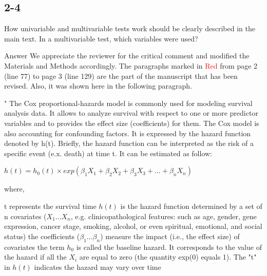 \documentclass[preprint,12pt]{elsarticle}
\newenvironment{MyColorPar}[1]{%
    \leavevmode\color{#1}\ignorespaces%
}{%
}%
\begin{document}
\subsection*{2-4} %
How univariable and multivariable tests work should be clearly described in the main text. In a multivariable test, which variables were used?




%
\begin{MyColorPar}{blue}
Answer
We appreciate the reviewer for the critical comment and modified the Materials and Methods accordingly.
The paragraphs marked in \textcolor{red}{Red} from page 2 (line 77) to page 3 (line 129) are the part of the manuscript that has been revised. Also, it was shown here in the following paragraph.
\\[0.3cm]

\begin{MyColorPar}{red}
"
The Cox proportional-hazards model\cite{Cox1972}\cite{Andersen1982} is commonly used for modeling survival analysis data. It allows to analyze survival with respect to one or more predictor variables and to provides the effect size (coefficients) for them\cite{Bradburn2003b}. %
The Cox model is also accounting for confounding factors\cite{Magen2019}.
It is expressed by the hazard function denoted by h(t). Briefly, the hazard function can be interpreted as the risk of a specific event (e.x. death) at time t. It can be estimated as follow:

\begin{flushleft}

$h(t) = h_0(t) \times exp(\beta_1 X_1 + \beta_2 X_2 + \beta_3 X_3 + ... + \beta_n X_n)$\\[0.3cm]
\end{flushleft}
where,\\
\begin{outline} %
\1 t represents the survival time
\1 $h(t)$ is the hazard function determined by a set of n covariates ($X_1...X_n$, e.g. clinicopathological features: such as age, gender, gene expression, cancer stage, smoking, alcohol, or even spiritual, emotional, and social status)
\1 the coefficients ($\beta_1...\beta_n$) measure the impact (i.e., the effect size) of covariates
\1 the term $h_0$ is called the baseline hazard. It corresponds to the value of the hazard if all the $X_i$ are equal to zero (the quantity exp(0) equals 1). The "t" in $h(t)$ indicates the hazard may vary over time
\end{outline}


\end{MyColorPar}
\end{MyColorPar}
\end{document}
